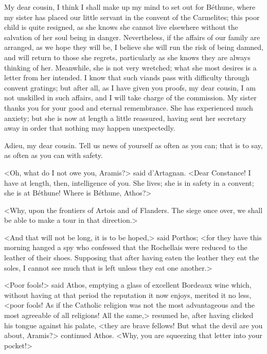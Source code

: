 \begin{mail}{}{My dear cousin,}
I think I shall make up my mind to set out for Béthune, where my sister has placed our little servant in the convent of the Carmelites; this poor child is quite resigned, as she knows she cannot live elsewhere without the salvation of her soul being in danger. Nevertheless, if the affairs of our family are arranged, as we hope they will be, I believe she will run the risk of being damned, and will return to those she regrets, particularly as she knows they are always thinking of her. Meanwhile, she is not very wretched; what she most desires is a letter from her intended. I know that such viands pass with difficulty through convent gratings; but after all, as I have given you proofs, my dear cousin, I am not unskilled in such affairs, and I will take charge of the commission. My sister thanks you for your good and eternal remembrance. She has experienced much anxiety; but she is now at length a little reassured, having sent her secretary away in order that nothing may happen unexpectedly.

Adieu, my dear cousin. Tell us news of yourself as often as you can; that is to say, as often as you can with safety. 

\end{mail}

<Oh, what do I not owe you, Aramis?> said d'Artagnan. <Dear Constance! I have at length, then, intelligence of you. She lives; she is in safety in a convent; she is at Béthune! Where is Béthune, Athos?> 

<Why, upon the frontiers of Artois and of Flanders. The siege once over, we shall be able to make a tour in that direction.> 

<And that will not be long, it is to be hoped,> said Porthos; <for they have this morning hanged a spy who confessed that the Rochellais were reduced to the leather of their shoes. Supposing that after having eaten the leather they eat the soles, I cannot see much that is left unless they eat one another.> 

<Poor fools!> said Athos, emptying a glass of excellent Bordeaux wine which, without having at that period the reputation it now enjoys, merited it no less, <poor fools! As if the Catholic religion was not the most advantageous and the most agreeable of all religions! All the same,> resumed he, after having clicked his tongue against his palate, <they are brave fellows! But what the devil are you about, Aramis?> continued Athos. <Why, you are squeezing that letter into your pocket!> 

